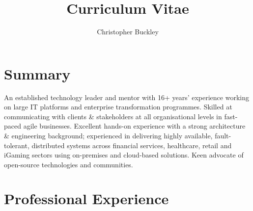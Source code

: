\documentclass{cv}
\title{Curriculum Vitae}
\author{Christopher Buckley}
\begin{document}

\section{Summary}

An established technology leader and mentor with 16+ years' experience working on large IT platforms
and enterprise transformation programmes. Skilled at communicating with clients \& stakeholders at
all organisational levels in fast-paced agile businesses. Excellent hands-on experience with a strong
architecture \& engineering background; experienced in delivering highly available, fault-tolerant,
distributed systems across financial services, healthcare, retail and iGaming sectors using
on-premises and cloud-based solutions. Keen advocate of open-source technologies and communities.


\section{Professional Experience}
\end{document}
